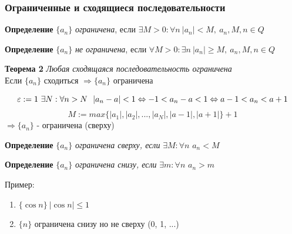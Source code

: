 \subsubsection*{Ограниченные и сходящиеся последовательности}

\begin{tcolorbox}
\textbf{Определение}
$\{a_n\}$  \textit{ограничена}, если $\exists M>0: \forall n\ |a_n|<M,\ a_n, M, n \in Q$
\end{tcolorbox}

\begin{tcolorbox}
\textbf{Определение}
$\{a_n\}$  \textit{не ограничена}, если $\forall M>0: \exists n\ |a_n|\geq M,\ a_n, M, n \in Q$ 
\end{tcolorbox}

\begin{tcolorbox}
\textbf{Теорема 2} \textit{Любая сходящаяся последовательность ограничена} \\
Если $\{a_n\}$ сходиться $\Rightarrow \{a_n\}$ ограничена
\end{tcolorbox}

\begin{tcolorbox}[title=Доказательство Т2, breakable]
\[\eps := 1\ \exists N: \forall n > N\ \ |a_n-a| < 1 \Leftrightarrow -1<a_n-a<1 \Leftrightarrow a-1 < a_n < a+1  \]
\[ M:= max\{ |a_1|, |a_2|, ..., |a_N|, |a-1|, |a+1| \} + 1\]
$\Rightarrow \{a_n\}$ - ограничена (сверху)
\end{tcolorbox}

\begin{tcolorbox}
\textbf{Определение}
$\{a_n\}$  \textit{ограничена сверху, если} $\exists M: \forall n$ $a_n < M$
\end{tcolorbox}

\begin{tcolorbox}
\textbf{Определение}
$\{a_n\}$  \textit{ограничена снизу, если} $\exists m: \forall n$ $a_n > m$
\end{tcolorbox}

Пример:
\begin{enumerate}
    \item $\{\cos n\}\ |\cos n| \leq 1$
    \item $\{n\}$ ограничена снизу но не сверху (0, 1, ...)
\end{enumerate}

